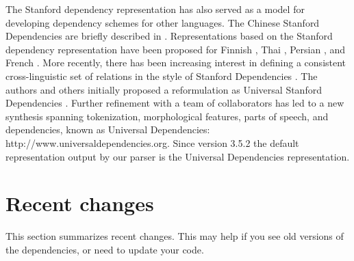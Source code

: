 \documentclass[11pt,letterpaper]{article}
\def\url#1{\textsf{#1}}
\begin{document}
The Stanford dependency representation has also served as a model for
developing dependency schemes for other languages. The Chinese Stanford
Dependencies are briefly described in
\citet{chang-tseng-jurafsky-manning:2009:SSST}. Representations
based on the Stanford dependency representation have been proposed for
Finnish \citep{Haverinen2010a,Haverinen2010b}, Thai \citep{Potisuk10},
Persian \citep{Seraji12}, and French \citep{Maarouf12}. 
More recently, there has been increasing interest in defining a
consistent cross-linguistic set of relations in the style of Stanford
Dependencies
\citep{mcdonald-EtAl:2013:Short,tsarfaty:2013:Short}. The authors and
others initially proposed a reformulation as Universal Stanford
Dependencies \citep{marneffe14universal}. Further refinement with a
team of collaborators has led to a new synthesis spanning
tokenization, morphological features, parts of speech, and
dependencies, known as Universal Dependencies: 
\url{http://www.universaldependencies.org}.  Since version 3.5.2 
the default representation output by our parser is the Universal Dependencies
representation.

\section{Recent changes}

This section summarizes recent changes. This may help if you see old
versions of the dependencies, or need to update your code.
\end{document}
